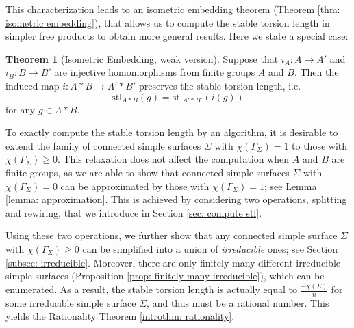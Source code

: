 \documentclass{amsart}
\theoremstyle{definition}
\numberwithin{equation}{section}
\theoremstyle{theorem}
\newtheorem{theoremA}{Theorem}
\theoremstyle{remark}
\def\stl{\mathrm{stl}}
\begin{document}
	This characterization leads to an isometric embedding theorem (Theorem \ref{thm: isometric embedding}), that allows us to compute the stable torsion length in simpler free products to obtain more general results. Here we state a special case:
	
	\begin{theoremA}[Isometric Embedding, weak version]\label{introthm: Isom emb}
	    Suppose that $i_A :A\to A'$ and $i_B: B\to B'$ are injective homomorphisms from finite groups $A$ and $B$. 
	    Then the induced map $i: A*B\to A'*B'$ preserves the stable torsion length, i.e.
		$$\stl_{A*B}(g)=\stl_{A'*B'}(i(g))$$
		for any $g\in A*B$.
	\end{theoremA}
	
		
	To exactly compute the stable torsion length by an algorithm, it is desirable to extend the family of connected simple surfaces $\Sigma$ with $\chi(\Gamma_\Sigma)=1$ to those with $\chi(\Gamma_\Sigma)\ge0$. This relaxation does not affect the computation when $A$ and $B$ are finite groups, as we are able to show that connected simple surfaces $\Sigma$ with $\chi(\Gamma_\Sigma)=0$ can be approximated by those with $\chi(\Gamma_\Sigma)=1$; see Lemma \ref{lemma: approximation}. This is achieved by considering two operations, splitting and rewiring, that we introduce in Section \ref{sec: compute stl}. 
	
	Using these two operations, we further show that any connected simple surface $\Sigma$ with $\chi(\Gamma_\Sigma)\ge0$ can be simplified into a union of \emph{irreducible} ones; see Section \ref{subsec: irreducible}. Moreover, there are only finitely many different irreducible simple surfaces (Proposition \ref{prop: finitely many irreducible}), which can be enumerated. As a result, the stable torsion length is actually equal to $\frac{-\chi(\Sigma)}{n}$ for some irreducible simple surface $\Sigma$, and thus must be a rational number. This yields the Rationality Theorem \ref{introthm: rationality}.
	
\end{document}
